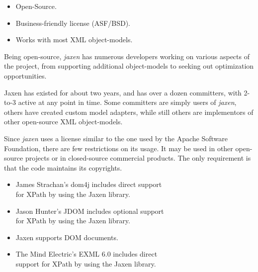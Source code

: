 \documentclass[20pt,landscape,headrule,footrule]{foils}
\begin{document}


\begin{itemize}
  \item Open-Source.
  \item Business-friendly license (ASF/BSD).
  \item Works with most XML object-models.
\end{itemize}



Being open-source, \emph{jaxen} has numerous developers working
on various aspects of the project, from supporting
additional object-models to seeking out optimization
opportunities.

Jaxen has existed for about two years, and has over a dozen
committers, with 2-to-3 active at any point in time.  Some
committers are simply users of \emph{jaxen}, others have created
custom model adapters, while still others are implementors
of other open-source XML object-models.



Since \emph{jaxen} uses a license similar to the one used by
the Apache Software Foundation, there are few restrictions
on its usage.  It may be used in other open-source projects
or in closed-source commercial products.  The only requirement
is that the code maintains its copyrights.  

\begin{center}
\end{center}



\begin{itemize}
  \item {}
    James Strachan's dom4j includes direct support\\ 
    for XPath by using the Jaxen library.
  \item {}
    Jason Hunter's JDOM includes optional support\\ 
    for XPath by using the Jaxen library.
  \item {}
    Jaxen supports DOM documents.
  \item {}
    The Mind Electric's EXML 6.0 includes direct \\
    support for XPath by using the Jaxen library.
\end{itemize}
\end{document}
